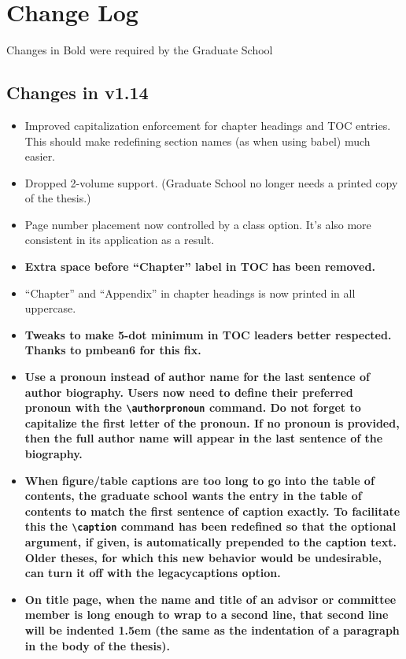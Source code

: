 \chapter{Change Log}
Changes in Bold were required by the Graduate School

\section{Changes in v1.14}
\begin{itemize}
\item{Improved capitalization enforcement for chapter headings and TOC entries.  This should make redefining section names (as when using babel) much easier.}
\item{Dropped 2-volume support. (Graduate School no longer needs a printed copy of the thesis.)}
\item{Page number placement now controlled by a class option.  It's also more consistent in its application as a result.}
\item{\bfseries Extra space before ``Chapter'' label in TOC has been removed.}
\item{``Chapter'' and ``Appendix'' in chapter headings is now printed in all uppercase.}
\item{\bfseries Tweaks to make 5-dot minimum in TOC leaders better respected.  Thanks to pmbean6 for this fix.}
\item{\bfseries Use a pronoun instead of author name for the last sentence of author biography.  Users now need to define their preferred pronoun with the \verb=\authorpronoun= command.  Do not forget to capitalize the first letter of the pronoun.  If no pronoun is provided, then the full author name will appear in the last sentence of the biography.}
\item{\bfseries When figure/table captions are too long to go into the table of contents, the graduate school wants the entry in the table of contents to match the first sentence of caption exactly.  To facilitate this the \verb=\caption= command has been redefined so that the optional argument, if given, is automatically prepended to the caption text.  Older theses, for which this new behavior would be undesirable, can turn it off with the legacycaptions option.}
\item{\bfseries On title page, when the name and title of an advisor or committee member is long enough to wrap to a second line, that second line will be indented 1.5em (the same as the indentation of a paragraph in the body of the thesis).}
\end{itemize}

